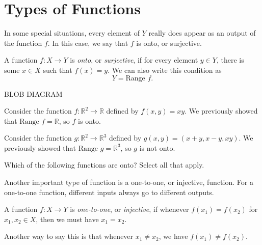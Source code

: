 \documentclass{ximera}
\begin{document}
\section*{Types of Functions}

In some special situations, every element of $Y$ really does appear as an output of the function $f$. In this case, we say that $f$ is onto, or surjective.

\begin{definition}
A function $f:X\rightarrow Y$ is \emph{onto}, or \emph{surjective}, if for every element $y\in Y$, there is some $x\in X$ such that $f(x) = y$. We can also write this condition as 
\[
Y = \textrm{Range }f.
\]
\end{definition}

BLOB DIAGRAM

\begin{example}
Consider the function $f:\mathbb{R}^2\rightarrow\mathbb{R}$ defined by $f(x,y) = xy$. We previously showed that $\text{Range }f=\mathbb{R}$, so $f$ is onto.

Consider the function $g:\mathbb{R}^2\rightarrow\mathbb{R}^3$ defined by $g(x,y) = (x+y, x-y, xy)$. We previously showed that $\text{Range }g=\mathbb{R}^3$, so $g$ is not onto.
\end{example}

\begin{problem}
Which of the following functions are onto? Select all that apply.
\begin{selectAll}
\end{selectAll}
\end{problem}

Another important type of function is a one-to-one, or injective, function. For a one-to-one function, different inputs always go to different outputs.

\begin{definition}
A function $f:X\rightarrow Y$ is \emph{one-to-one}, or \emph{injective}, if whenever $f(x_1) = f(x_2)$ for $x_1,x_2\in X$, then we must have $x_1 = x_2$.

Another way to say this is that whenever $x_1\neq x_2$, we have $f(x_1)\neq f(x_2)$.
\end{definition}
\end{document}
